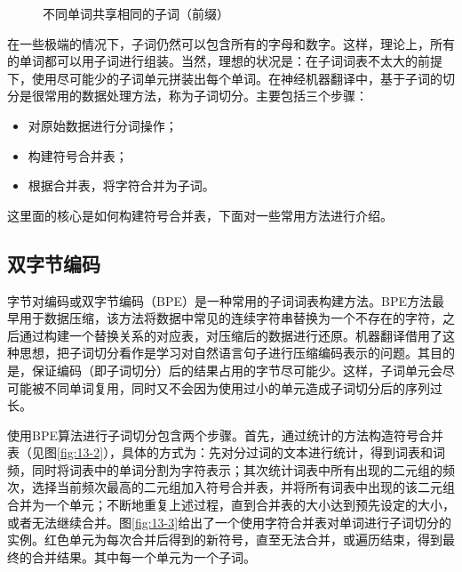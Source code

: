 \begin{figure}[htp]
\centering

\caption{不同单词共享相同的子词（前缀）}
\label{fig:13-1}
\end{figure}

\parinterval 在一些极端的情况下，子词仍然可以包含所有的字母和数字。这样，理论上，所有的单词都可以用子词进行组装。当然，理想的状况是：在子词词表不太大的前提下，使用尽可能少的子词单元拼装出每个单词。在神经机器翻译中，基于子词的切分是很常用的数据处理方法，称为子词切分。主要包括三个步骤：

\begin{itemize}
\vspace{0.5em}
\item 对原始数据进行分词操作；
\vspace{0.5em}
\item 构建符号合并表；
\vspace{0.5em}
\item 根据合并表，将字符合并为子词。
\vspace{0.5em}
\end{itemize}

\parinterval 这里面的核心是如何构建符号合并表，下面对一些常用方法进行介绍。


\subsection{双字节编码}

\parinterval 字节对编码或双字节编码（BPE）是一种常用的子词词表构建方法。BPE方法最早用于数据压缩，该方法将数据中常见的连续字符串替换为一个不存在的字符，之后通过构建一个替换关系的对应表，对压缩后的数据进行还原。机器翻译借用了这种思想，把子词切分看作是学习对自然语言句子进行压缩编码表示的问题。其目的是，保证编码（即子词切分）后的结果占用的字节尽可能少。这样，子词单元会尽可能被不同单词复用，同时又不会因为使用过小的单元造成子词切分后的序列过长。

\parinterval 使用BPE算法进行子词切分包含两个步骤。首先，通过统计的方法构造符号合并表（见图\ref{fig:13-2}），具体的方式为：先对分过词的文本进行统计，得到词表和词频，同时将词表中的单词分割为字符表示；其次统计词表中所有出现的二元组的频次，选择当前频次最高的二元组加入符号合并表，并将所有词表中出现的该二元组合并为一个单元；不断地重复上述过程，直到合并表的大小达到预先设定的大小，或者无法继续合并。图\ref{fig:13-3}给出了一个使用字符合并表对单词进行子词切分的实例。红色单元为每次合并后得到的新符号，直至无法合并，或遍历结束，得到最终的合并结果。其中每一个单元为一个子词。

